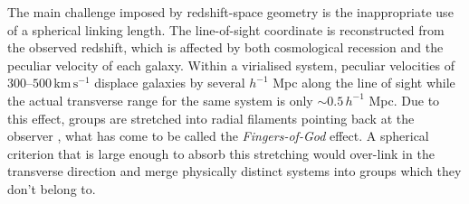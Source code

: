 \documentclass[9pt,a4paper,twocolumn,twoside]{rho-class/rho}
\begin{document}
The main challenge imposed by redshift-space geometry is the inappropriate use
of a spherical linking length. The line-of-sight coordinate is reconstructed
from the observed redshift, which is affected by both cosmological recession and
the peculiar velocity of each galaxy. Within a virialised system, peculiar
velocities of 300--$500\,\mathrm{km\,s^{-1}}$ displace galaxies by several
$h^{-1}$ Mpc along the line of sight while the actual transverse range for the
same system is only $\sim 0.5\,h^{-1}$ Mpc. Due to this effect, groups are
stretched into radial filaments pointing back at the observer \cite{jackson1972},
what has come to be called the \emph{Fingers-of-God} effect. A spherical
criterion that is large enough to absorb this stretching would over-link in the
transverse direction and merge physically distinct systems into groups which they
don't belong to.
\end{document}

